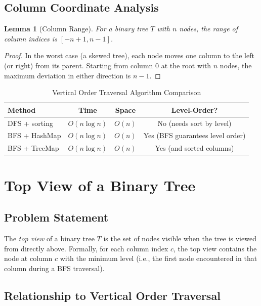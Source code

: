 \documentclass[10pt,journal,compsoc,onecolumn]{IEEEtran}
\newtheorem{lemma}[theorem]{Lemma}
\begin{document}
\subsection{Column Coordinate Analysis}

\begin{lemma}[Column Range]
For a binary tree $T$ with $n$ nodes, the range of column indices is $[-n+1, n-1]$.
\end{lemma}

\begin{proof}
In the worst case (a skewed tree), each node moves one column to the left (or right) from its parent. Starting from column 0 at the root with $n$ nodes, the maximum deviation in either direction is $n - 1$.
\end{proof}

\begin{table}[h]
\centering
\caption{Vertical Order Traversal Algorithm Comparison}
\begin{tabular}{lccc}
\toprule
\textbf{Method} & \textbf{Time} & \textbf{Space} & \textbf{Level-Order?} \\
\midrule
DFS + sorting & $O(n \log n)$ & $O(n)$ & No (needs sort by level) \\
BFS + HashMap & $O(n \log n)$ & $O(n)$ & Yes (BFS guarantees level order) \\
BFS + TreeMap & $O(n \log n)$ & $O(n)$ & Yes (and sorted columns) \\
\bottomrule
\end{tabular}
\end{table}

\section{Top View of a Binary Tree}
\label{sec:topview}

\subsection{Problem Statement}

The \emph{top view} of a binary tree $T$ is the set of nodes visible when the tree is viewed from directly above. Formally, for each column index $c$, the top view contains the node at column $c$ with the minimum level (i.e., the first node encountered in that column during a BFS traversal).

\subsection{Relationship to Vertical Order Traversal}
\end{document}
